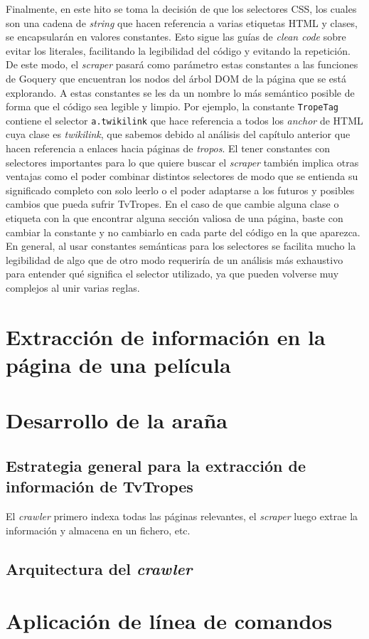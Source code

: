 Finalmente, en este hito se toma la decisión de que los selectores CSS, los
cuales son una cadena de \textit{string} que hacen referencia a varias etiquetas
HTML y clases, se encapsularán en valores constantes. Esto sigue las guías de
\textit{clean code} sobre evitar los literales, facilitando la legibilidad del
código y evitando la repetición. De este modo, el \textit{scraper} pasará como
parámetro estas constantes a las funciones de Goquery que encuentran los nodos
del árbol DOM de la página que se está explorando. A estas constantes se les da
un nombre lo más semántico posible de forma que el código sea legible y limpio.
Por ejemplo, la constante \texttt{TropeTag} contiene el selector \texttt{a.twikilink} que hace referencia a todos los \textit{anchor} de HTML
cuya clase es \textit{twikilink}, que sabemos debido al análisis del capítulo
anterior que hacen referencia a enlaces hacia páginas de \textit{tropos}. El
tener constantes con selectores importantes para lo que quiere buscar el
\textit{scraper} también implica otras ventajas como el poder combinar distintos
selectores de modo que se entienda su significado completo con solo leerlo o el
poder adaptarse a los futuros y posibles cambios que pueda sufrir TvTropes. En
el caso de que cambie alguna clase o etiqueta con la que encontrar alguna
sección valiosa de una página, baste con cambiar la constante y no cambiarlo en
cada parte del código en la que aparezca. En general, al usar constantes
semánticas para los selectores se facilita mucho la legibilidad de algo que de
otro modo requeriría de un análisis más exhaustivo para entender qué significa
el selector utilizado, ya que pueden volverse muy complejos al unir varias
reglas.

\section{Extracción de información en la página de una película}

\section{Desarrollo de la araña}

\subsection{Estrategia general para la extracción de información de TvTropes}
El \textit{crawler} primero indexa todas las páginas relevantes, el
\textit{scraper} luego extrae la información y almacena en un fichero, etc.

\subsection{Arquitectura del \textit{crawler}}

\section{Aplicación de línea de comandos}